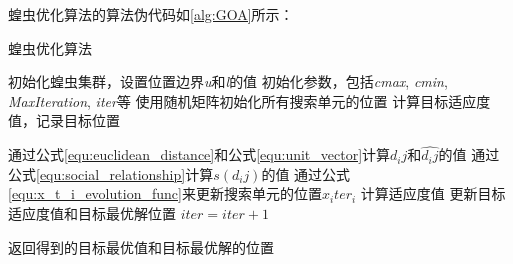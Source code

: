 蝗虫优化算法的算法伪代码如\ref{alg:GOA}所示：
\begin{algorithm}

    \caption{蝗虫优化算法}
    \label{alg:GOA}
    
    \begin{algorithmic}[1]
    \State 初始化蝗虫集群，设置位置边界\emph{u}和\emph{l}的值
    \State 初始化参数，包括\emph{cmax}, \emph{cmin}, \emph{MaxIteration}, \emph{iter}等
    \State 使用随机矩阵初始化所有搜索单元的位置
    \State 计算目标适应度值，记录目标位置
    
    \State 通过公式\ref{equ:euclidean_distance}和公式\ref{equ:unit_vector}计算$d_ij$和$\widehat{d_ij}$的值
    \State 通过公式\ref{equ:social_relationship}计算$s(d_ij)$的值
    \State 通过公式\ref{equ:x_t_i_evolution_func}来更新搜索单元的位置$x_iter_i$
    \State 计算适应度值
        \State 更新目标适应度值和目标最优解位置
    \EndIf
    \State $iter = iter +1$
     
    \EndWhile

    \State 返回得到的目标最优值和目标最优解的位置
    
    
    \end{algorithmic}
    
\end{algorithm}






